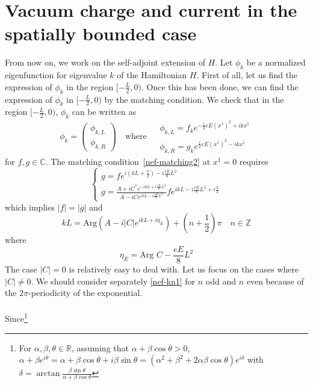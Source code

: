 \section{Vacuum charge and current in the spatially bounded case}
From now on, we work on the self-adjoint extension of $H$.
Let $\phi_k$ be a normalized eigenfunction for eigenvalue $k$ of the Hamiltonian $H$. 
First of all, 
let us find the expression of $\phi_k$ in the region $[-\frac{L}{2}, 0)$.
Once this has been done, 
we can find the expression of $\phi_k$ in $[-\frac L 2, 0)$ by the matching condition.
We check that in the region $[-\frac{L}{2}, 0)$, 
$\phi_k$ can be written as 
\begin{equation}\label{nef-boundCond}
\phi_k =\begin{pmatrix}
\phi_{k,L}  \\
\phi_{k,R}
\end{pmatrix} 
\quad \textrm{where $\begin{split} 
 & \phi_{k,L} = f_k e^{-\frac{i}{2}eE(x^1)^2 + ikx^1} \\
& \phi_{k,R} = g_k e^{\frac{i}{2}eE(x^1)^2 - ikx^1}
\end{split}
$}
\end{equation}
for $f, g\in \mathbb{C}$. 
The matching condition~\cref{nef-matching2} at $x^1 = 0$ requires
\begin{equation}
\begin{cases}
g = fe^{i(kL + \frac{\pi}{2}) - i\frac{eE}{8}L^2}  \\
g = \frac{A + iC^* e^{-ikL + i\frac{eE}{8}L^2 }}{A - iC e^{ikL - i\frac{eE}{8}L^2}} fe^{ikL - i\frac{eE}{8}L^2 + i\frac{\pi}{2}}
\end{cases}
\end{equation}
which implies $|f| = |g|$ and
\begin{equation}\label{nef-kn1}
kL = \textrm{Arg}(A - i|C| e^{ikL + i\eta_E}) + (n + \frac{1}{2})\pi \quad n\in \mathbb{Z}
\end{equation}
where
\begin{equation*}
\eta_E = \textrm{Arg } C - \frac{eE}{8}L^2 
\end{equation*}
The case $|C| =0$ is relatively easy to deal with. Let us focus on the cases where $|C| \neq 0$. We should consider separately \cref{nef-kn1} for $n$ odd and $n$ even because of the $2\pi$-periodicity of the exponential. \\\\
Since\footnote{
For $\alpha, \beta, \theta \in \mathbb{R}$, assuming that $\alpha + \beta \cos \theta > 0$, $\alpha + \beta e^{i \theta} = \alpha + \beta \cos \theta + i\beta \sin \theta = (\alpha^2 + \beta^2 + 2\alpha \beta \cos \theta) e^{i \delta}$ with $\delta = \arctan \frac{\beta\sin\theta}{\alpha + \beta\cos\theta}$  
} 
